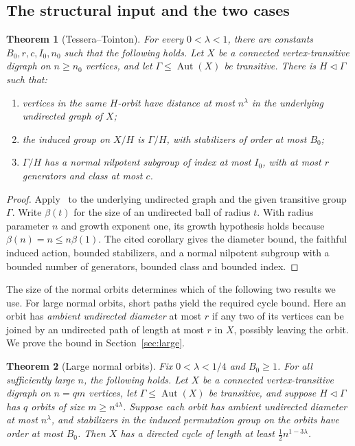 \documentclass[11pt,a4paper,reqno]{amsart}
\newtheorem{theorem}{Theorem}[section]
\theoremstyle{definition}
\theoremstyle{remark}
\numberwithin{equation}{section}
\DeclareMathOperator{\Aut}{Aut}
\begin{document}
\subsection{The structural input and the two cases}
\begin{theorem}[Tessera--Tointon]\label{thm:structure}
For every $0<\lambda<1$, there are constants $B_0,r,c,I_0,n_0$ such that the following holds. Let $X$ be a connected vertex-transitive digraph on $n\ge n_0$ vertices, and let $\Gamma\le\Aut(X)$ be transitive. There is $H\lhd\Gamma$ such that:
\begin{enumerate}
\item vertices in the same $H$-orbit have distance at most $n^\lambda$ in the underlying undirected graph of $X$;
\item the induced group on $X/H$ is $\Gamma/H$, with stabilizers of order at most $B_0$;
\item $\Gamma/H$ has a normal nilpotent subgroup of index at most $I_0$, with at most $r$ generators and class at most $c$.
\end{enumerate}
\end{theorem}
\begin{proof}
Apply~\cite[Corollary 2.4]{TT} to the underlying undirected graph and the given transitive group $\Gamma$. Write $\beta(t)$ for the size of an undirected ball of radius $t$. With radius parameter $n$ and growth exponent one, its growth hypothesis holds because $\beta(n)=n\le n\beta(1)$. The cited corollary gives the diameter bound, the faithful induced action, bounded stabilizers, and a normal nilpotent subgroup with a bounded number of generators, bounded class and bounded index.
\end{proof}

The size of the normal orbits determines which of the following two results we use. For large normal orbits, short paths yield the required cycle bound. Here an orbit has \emph{ambient undirected diameter} at most $r$ if any two of its vertices can be joined by an undirected path of length at most $r$ in $X$, possibly leaving the orbit. We prove the bound in Section~\ref{sec:large}.

\begin{theorem}[Large normal orbits]\label{thm:large}
Fix $0<\lambda<1/4$ and $B_0\ge1$. For all sufficiently large $n$, the following holds. Let $X$ be a connected vertex-transitive digraph on $n=qm$ vertices, let $\Gamma\le\Aut(X)$ be transitive, and suppose $H\lhd\Gamma$ has $q$ orbits of size $m\ge n^{4\lambda}$. Suppose each orbit has ambient undirected diameter at most $n^\lambda$, and stabilizers in the induced permutation group on the orbits have order at most $B_0$. Then $X$ has a directed cycle of length at least $\tfrac12 n^{1-3\lambda}$.
\end{theorem}
\end{document}
